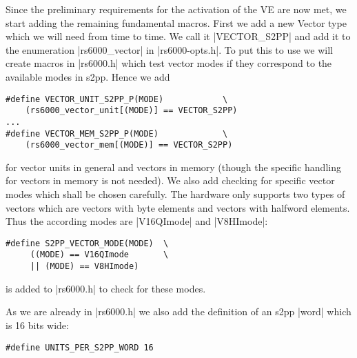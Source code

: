 Since the preliminary requirements for the activation of the VE are now met, we start adding the remaining fundamental macros.
First we add a new Vector type which we will need from time to time.
We call it |VECTOR_S2PP| and add it to the enumeration |rs6000_vector| in |rs6000-opts.h|.
To put this to use we will create macros in |rs6000.h| which test vector modes if they correspond to the available modes in s2pp.
Hence we add 
\begin{lstlisting}
#define VECTOR_UNIT_S2PP_P(MODE)            \
    (rs6000_vector_unit[(MODE)] == VECTOR_S2PP)
...
#define VECTOR_MEM_S2PP_P(MODE)             \
    (rs6000_vector_mem[(MODE)] == VECTOR_S2PP)
\end{lstlisting}
for vector units in general and vectors in memory (though the specific handling for vectors in memory is not needed). 
We also add checking for specific vector modes which shall be chosen carefully.
The hardware only supports two types of vectors which are vectors with byte elements and vectors with halfword elements.
Thus the according modes are |V16QImode| and |V8HImode|:
\begin{lstlisting}
#define S2PP_VECTOR_MODE(MODE)  \
     ((MODE) == V16QImode       \
     || (MODE) == V8HImode)
\end{lstlisting}
is added to |rs6000.h| to check for these modes.

As we are already in |rs6000.h| we also add the definition of an s2pp |word| which is 16 bits wide:
\begin{lstlisting}
#define UNITS_PER_S2PP_WORD 16
\end{lstlisting}

